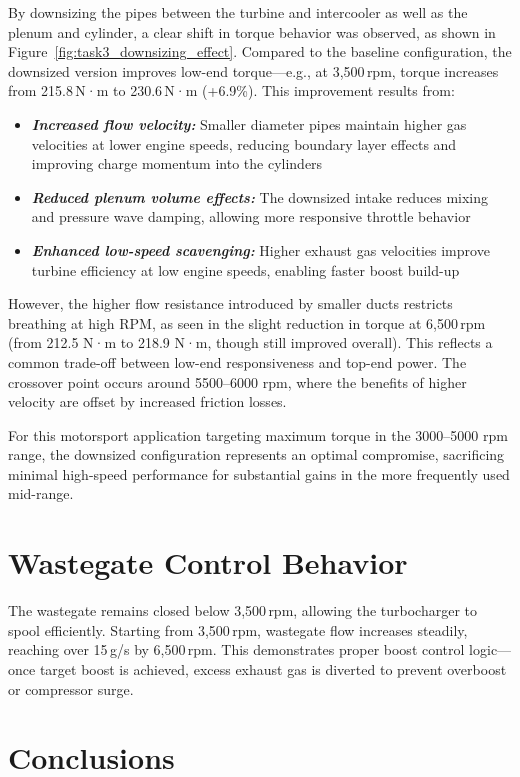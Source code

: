 By downsizing the pipes between the turbine and intercooler as well as the plenum and cylinder, a clear shift in torque behavior was observed, as shown in Figure~\ref{fig:task3_downsizing_effect}. Compared to the baseline configuration, the downsized version improves low-end torque—e.g., at 3,500\,rpm, torque increases from 215.8\,N·m to 230.6\,N·m (+6.9\%). This improvement results from:

\begin{itemize}
    \item \textbf{\textit{Increased flow velocity:}} Smaller diameter pipes maintain higher gas velocities at lower engine speeds, reducing boundary layer effects and improving charge momentum into the cylinders
    \item \textbf{\textit{Reduced plenum volume effects:}} The downsized intake reduces mixing and pressure wave damping, allowing more responsive throttle behavior
    \item \textbf{\textit{Enhanced low-speed scavenging:}} Higher exhaust gas velocities improve turbine efficiency at low engine speeds, enabling faster boost build-up
\end{itemize}

However, the higher flow resistance introduced by smaller ducts restricts breathing at high RPM, as seen in the slight reduction in torque at 6,500\,rpm (from 212.5 N·m to 218.9 N·m, though still improved overall). This reflects a common trade-off between low-end responsiveness and top-end power. The crossover point occurs around 5500--6000 rpm, where the benefits of higher velocity are offset by increased friction losses.

For this motorsport application targeting maximum torque in the 3000--5000 rpm range, the downsized configuration represents an optimal compromise, sacrificing minimal high-speed performance for substantial gains in the more frequently used mid-range.

\section{Wastegate Control Behavior}
The wastegate remains closed below 3,500\,rpm, allowing the turbocharger to spool efficiently. Starting from 3,500\,rpm, wastegate flow increases steadily, reaching over 15\,g/s by 6,500\,rpm. This demonstrates proper boost control logic—once target boost is achieved, excess exhaust gas is diverted to prevent overboost or compressor surge.

\section{Conclusions}

